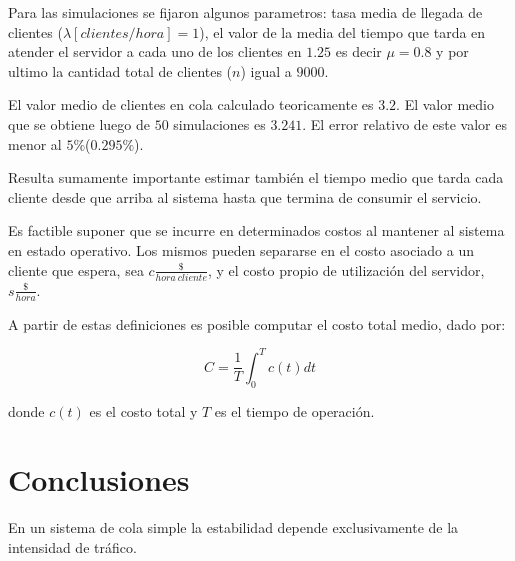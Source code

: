 \documentclass{sig-alternate}
\begin{document}
Para las simulaciones se fijaron algunos parametros: tasa media de llegada de 
clientes ($\lambda[clientes/hora]=1$), el valor de la media del tiempo que tarda 
en atender el servidor a cada uno de los clientes en $1.25$ es decir $\mu=0.8$ 
y por ultimo la cantidad total de clientes ($n$) igual a $9000$.   

El valor medio de clientes en cola calculado teoricamente es $3.2$. El valor
medio que se obtiene luego de $50$ simulaciones es $3.241$. El error
relativo de este valor es menor al $5\%$($0.295\%$).

Resulta sumamente importante estimar tambi\'{e}n el tiempo medio que tarda
cada cliente desde que arriba al sistema hasta que termina de consumir el
servicio. 


Es factible suponer que se incurre en determinados costos al mantener al
sistema en estado operativo. Los mismos pueden separarse en el costo
asociado a un cliente que espera, sea $c\frac{\$}{hora\ cliente}$, y el costo
propio de utilizaci\'{o}n del servidor, $s\frac{\$}{hora}$.

A partir de estas definiciones es posible computar el costo total medio, dado 
por:

\begin{equation}
\label{costo_total_medio}
C = \frac{1}{T} \int_{0}^{T} c(t) dt
\end{equation}

donde $c(t)$ es el costo total y $T$ es el tiempo de operaci\'{o}n.



\section{Conclusiones}\label{conclusiones}

En un sistema de cola simple la estabilidad depende exclusivamente de la
intensidad de tr\'{a}fico.
\end{document}

